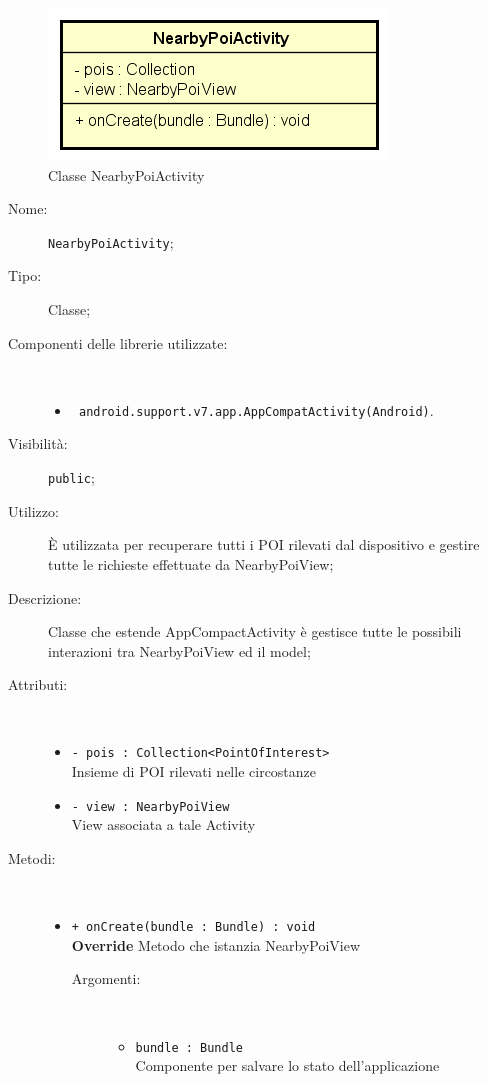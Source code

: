 \documentclass[../DefinizioneDiProdotto.tex]{subfiles}
\begin{document}
    \begin{figure}[H]
        \centering
        \includegraphics{img/NearbyPoiActivity.png}
        \caption{Classe NearbyPoiActivity}\label{fig:presenter::NearbyPoiActivity} 
    \end{figure}
    \begin{description}
\item[Nome:] \texttt{NearbyPoiActivity};
\item[Tipo:] Classe;
\item[Componenti delle librerie utilizzate:] \
\begin{itemize}
\item \texttt{ android.support.v7.app.AppCompatActivity(Android)}.

\end{itemize}
\item[Visibilità:] \texttt{public};
\item[Utilizzo:] È utilizzata per recuperare tutti i POI rilevati dal dispositivo e gestire tutte le richieste effettuate da NearbyPoiView;
\item[Descrizione:] Classe che estende AppCompactActivity è gestisce tutte le possibili interazioni tra NearbyPoiView ed il model;
\item[Attributi:] \
\begin{itemize}
\item \texttt{- pois : Collection<PointOfInterest>}\\
Insieme di POI rilevati nelle circostanze

\item \texttt{- view : NearbyPoiView}\\
View associata a tale Activity

\end{itemize}
\item[Metodi:] \
\begin{itemize}
\item \texttt{+ onCreate(bundle : Bundle) : void}\\
\textbf{Override} Metodo che istanzia NearbyPoiView
 \begin{description}
\item[Argomenti:] \
\begin{itemize}
\item \texttt{bundle : Bundle}\\
Componente per salvare lo stato dell'applicazione\end{itemize}
\end{description}
\end{itemize}
\end{description}
\end{document}
